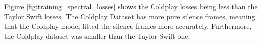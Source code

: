 Figure \ref{fig:training_spectral_losses} shows the Coldplay losses being less than the Taylor Swift losses. The Coldplay Dataset has more pure silence frames, meaning that the Coldplay model fitted the silence frames more accurately. Furthermore, the Coldplay dataset was smaller than the Taylor Swift one.

